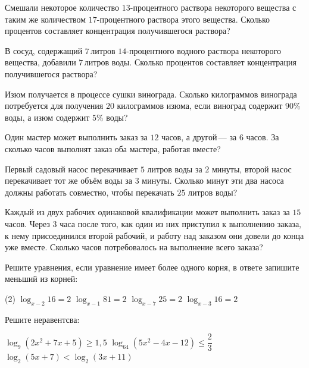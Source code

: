 \begin{class}[number=5]
\begin{listofex}
		\item Смешали некоторое количество \(13\)-процентного раствора некоторого вещества с таким же количеством \(17\)-процентного раствора этого вещества. Сколько процентов составляет концентрация получившегося раствора?
		\item В сосуд, содержащий \(7\) литров \(14\)-процентного водного раствора некоторого вещества, добавили \(7\) литров воды. Сколько процентов составляет концентрация получившегося раствора?
		\item Изюм получается в процессе сушки винограда. Сколько килограммов винограда потребуется для получения \(20\) килограммов изюма, если виноград содержит \(90\%\) воды, а изюм содержит \(5\%\) воды?
		
		\item Один мастер может выполнить заказ за \(12\) часов, а другой --- за \(6\) часов. За сколько часов выполнят заказ оба мастера, работая вместе?
		\item Первый садовый насос перекачивает \(5\) литров воды за \(2\) минуты, второй насос перекачивает тот же объём воды за \(3\) минуты. Сколько минут эти два насоса должны работать совместно, чтобы перекачать \(25\) литров воды?
		\item Каждый из двух рабочих одинаковой квалификации может выполнить заказ за \(15\) часов. Через \(3\) часа после того, как один из них приступил к выполнению заказа, к нему присоединился второй рабочий, и работу над заказом они довели до конца уже вместе. Сколько часов потребовалось на выполнение всего заказа?
		
		\item Решите уравнения, если уравнение имеет более одного корня, в ответе запишите меньший из корней:
		\begin{tasks}(2)
			\task \( \log_{x-2}16=2 \)
			\task \( \log_{x-1}81=2 \)
			\task \( \log_{x-7}25=2 \)
			\task \( \log_{x-3}16=2 \)
		\end{tasks}
		
		\item Решите неравентсва: %
		\begin{tasks}
			\task \( \log_9(2x^2+7x+5)\ge 1,5 \)
			\task \( \log_{64}(5x^2-4x-12) \le \dfrac{ 2 }{ 3 } \)
			\task \( \log_2(5x+7) < \log_2 (3x+11) \)
		\end{tasks}
	\end{listofex}
\end{class}

